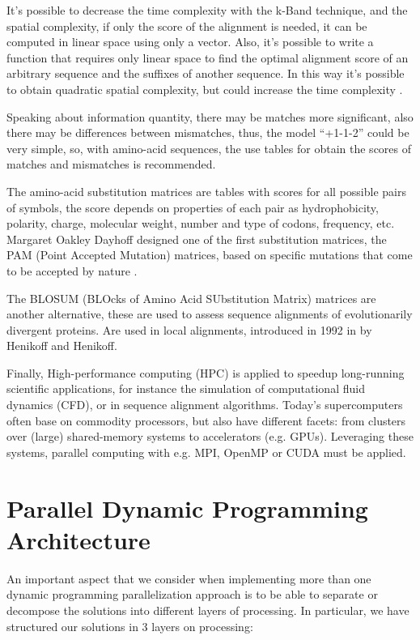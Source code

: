 \documentclass[journal]{IEEEtran}
\begin{document}
It's possible to decrease the time complexity with the k-Band technique, and the spatial complexity, if only the score of the alignment is needed, it can be computed in linear space using only a vector. Also, it's possible to write a function that requires only linear space to find the optimal alignment score of an arbitrary sequence and the suffixes  of another sequence. In this way it's possible to obtain quadratic spatial complexity, but could increase the time complexity \cite{hirschberg1975align}.

Speaking about information quantity, there may be matches more significant, also there may be differences between mismatches, thus, the model ``+1-1-2'' could be very simple, so, with amino-acid sequences, the use tables for obtain the scores of matches and mismatches is recommended.

The amino-acid substitution matrices are tables with scores for all possible pairs of symbols, the score depends on properties of each pair as hydrophobicity, polarity, charge, molecular weight, number and type of codons, frequency, etc. Margaret Oakley Dayhoff designed one of the first substitution matrices, the PAM (Point Accepted Mutation) matrices, based on specific mutations that come to be accepted by nature \cite{dayhoff1978align}.

The BLOSUM (BLOcks of Amino Acid SUbstitution Matrix) matrices are another alternative, these are used to assess sequence alignments of evolutionarily divergent proteins. Are used in local alignments, introduced in 1992 in \cite{henikoff1992align} by Henikoff and Henikoff.

Finally, High-performance computing (HPC) is applied to speedup long-running scientific applications, for instance the simulation of computational fluid dynamics (CFD), or in sequence alignment algorithms. Today's supercomputers often base on commodity processors, but also have different facets: from clusters over (large) shared-memory systems to accelerators (e.g. GPUs). Leveraging these systems, parallel computing with e.g. MPI, OpenMP or CUDA must be applied.

\section{Parallel Dynamic Programming Architecture}

An important aspect that we consider when implementing more than one dynamic programming parallelization approach is to be able to separate or decompose the solutions into different layers of processing. In particular, we have structured our solutions in 3 layers on processing:
\end{document}
